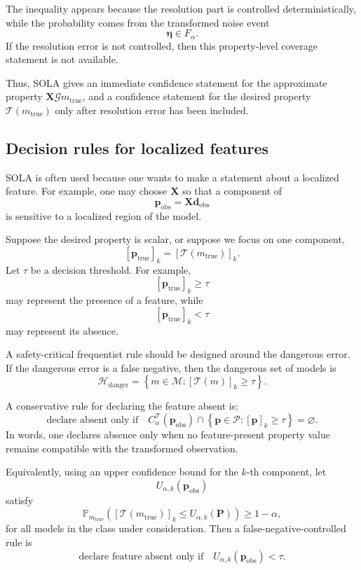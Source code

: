 \documentclass[11pt]{article}
\newcommand{\Mspace}{\mathcal M}
\newcommand{\Pspace}{\mathcal P}
\newcommand{\Prand}{\mathbf P}
\newcommand{\dobs}{\mathbf d_{\mathrm{obs}}}
\newcommand{\ptrue}{\mathbf p_{\mathrm{true}}}
\newcommand{\pobs}{\mathbf p_{\mathrm{obs}}}
\newcommand{\G}{\mathcal G}
\newcommand{\Tau}{\mathcal T}
\newcommand{\X}{\mathbf X}
\newcommand{\Prob}{\mathbb P}
\begin{document}
The inequality appears because the resolution part is controlled deterministically, while the probability comes from the transformed noise event
\[
    \boldsymbol{\eta}\in F_{\alpha}.
\]
If the resolution error is not controlled, then this property-level coverage statement is not available.

Thus, SOLA gives an immediate confidence statement for the approximate property \(\X\G m_{\mathrm{true}}\), and a confidence statement for the desired property \(\Tau(m_{\mathrm{true}})\) only after resolution error has been included.

\subsection{Decision rules for localized features}

SOLA is often used because one wants to make a statement about a localized feature. For example, one may choose \(\X\) so that a component of
\[
    \pobs=\X\dobs
\]
is sensitive to a localized region of the model.

Suppose the desired property is scalar, or suppose we focus on one component,
\[
    [\ptrue]_k
    =
    [\Tau(m_{\mathrm{true}})]_k.
\]
Let \(\tau\) be a decision threshold. For example,
\[
    [\ptrue]_k\geq \tau
\]
may represent the presence of a feature, while
\[
    [\ptrue]_k<\tau
\]
may represent its absence.

A safety-critical frequentist rule should be designed around the dangerous error. If the dangerous error is a false negative, then the dangerous set of models is
\[
    \mathcal H_{\mathrm{danger}}
    =
    \left\{
        m\in\Mspace:
        [\Tau(m)]_k\geq \tau
    \right\}.
\]

A conservative rule for declaring the feature absent is:
\[
    \text{declare absent only if}
    \quad
    C_{\alpha}^{\Tau}(\pobs)
    \cap
    \left\{
        \mathbf p\in\Pspace:
        [\mathbf p]_k\geq \tau
    \right\}
    =
    \varnothing.
\]
In words, one declares absence only when no feature-present property value remains compatible with the transformed observation.

Equivalently, using an upper confidence bound for the \(k\)-th component, let
\[
    U_{\alpha,k}(\pobs)
\]
satisfy
\[
    \Prob_{m_{\mathrm{true}}}
    \left(
        [\Tau(m_{\mathrm{true}})]_k
        \leq
        U_{\alpha,k}(\Prand)
    \right)
    \geq
    1-\alpha,
\]
for all models in the class under consideration. Then a false-negative-controlled rule is
\[
    \text{declare feature absent only if}
    \quad
    U_{\alpha,k}(\pobs)<\tau.
\]
\end{document}

